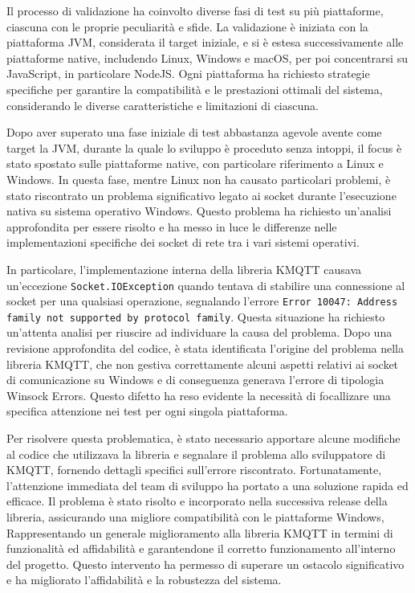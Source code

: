 \documentclass[12pt,a4paper,openright,twoside]{book}
\begin{document}
Il processo di validazione ha coinvolto diverse fasi di test su più piattaforme, ciascuna con le proprie peculiarità e sfide. 
La validazione è iniziata con la piattaforma \ac{JVM}, considerata il target iniziale, e si è estesa successivamente alle piattaforme native, 
includendo Linux, Windows e macOS, per poi concentrarsi su JavaScript, in particolare NodeJS. Ogni piattaforma ha richiesto strategie specifiche 
per garantire la compatibilità e le prestazioni ottimali del sistema, considerando le diverse caratteristiche e limitazioni di ciascuna.

Dopo aver superato una fase iniziale di test abbastanza agevole avente come target la \ac{JVM}, durante la quale lo sviluppo è proceduto senza intoppi, 
il focus è stato spostato sulle piattaforme native, con particolare riferimento a Linux e Windows. In questa fase, mentre Linux non ha causato particolari problemi, 
è stato riscontrato un problema significativo legato ai socket durante l'esecuzione nativa su sistema operativo Windows. Questo problema ha richiesto un'analisi 
approfondita per essere risolto e ha messo in luce le differenze nelle implementazioni specifiche dei socket di rete tra i vari sistemi operativi.

In particolare, l'implementazione interna della libreria KMQTT causava un'eccezione \texttt{Socket.IOException} quando tentava di stabilire una connessione 
al socket per una qualsiasi operazione, segnalando l'errore \texttt{Error 10047: Address family not supported by protocol family}. 
Questa situazione ha richiesto un'attenta analisi per riuscire ad individuare la causa del problema. Dopo una revisione approfondita del codice, è stata identificata 
l'origine del problema nella libreria KMQTT, che non gestiva correttamente alcuni aspetti relativi ai socket di comunicazione su Windows e di conseguenza generava l'errore 
di tipologia Winsock Errors. Questo difetto ha reso evidente la necessità di focallizare una specifica attenzione nei test per ogni singola piattaforma.

Per risolvere questa problematica, è stato necessario apportare alcune modifiche al codice che utilizzava la libreria e segnalare il problema allo sviluppatore 
di KMQTT, fornendo dettagli specifici sull'errore riscontrato. Fortunatamente, l'attenzione immediata del team di sviluppo ha portato a una soluzione rapida ed efficace. 
Il problema è stato risolto e incorporato nella successiva release della libreria, assicurando una migliore compatibilità con le piattaforme Windows,
Rappresentando un generale miglioramento alla libreria KMQTT in termini di funzionalità ed affidabilità e garantendone il corretto funzionamento all'interno del progetto. 
Questo intervento ha permesso di superare un ostacolo significativo e ha migliorato l'affidabilità e la robustezza del sistema.
\end{document}

